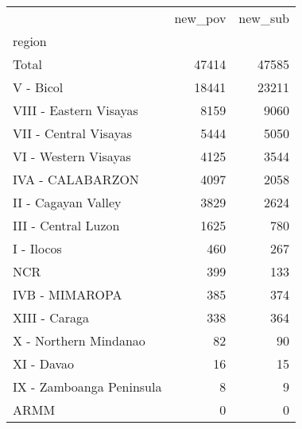 \begin{tabular}{lrr}
\toprule
{} &  new\_pov &  new\_sub \\
region                   &          &          \\
\midrule
Total                    &    47414 &    47585 \\
V - Bicol                &    18441 &    23211 \\
VIII - Eastern Visayas   &     8159 &     9060 \\
VII - Central Visayas    &     5444 &     5050 \\
VI - Western Visayas     &     4125 &     3544 \\
IVA - CALABARZON         &     4097 &     2058 \\
II - Cagayan Valley      &     3829 &     2624 \\
III - Central Luzon      &     1625 &      780 \\
I - Ilocos               &      460 &      267 \\
NCR                      &      399 &      133 \\
IVB - MIMAROPA           &      385 &      374 \\
XIII - Caraga            &      338 &      364 \\
X - Northern Mindanao    &       82 &       90 \\
XI - Davao               &       16 &       15 \\
IX - Zamboanga Peninsula &        8 &        9 \\
ARMM                     &        0 &        0 \\
\bottomrule
\end{tabular}
